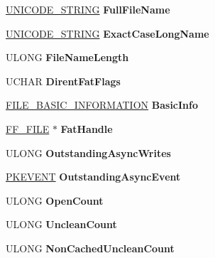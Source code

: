 \begin{DoxyCompactItemize}
\hyperlink{struct___u_n_i_c_o_d_e___s_t_r_i_n_g}{U\+N\+I\+C\+O\+D\+E\+\_\+\+S\+T\+R\+I\+NG} {\bfseries Full\+File\+Name}
\item 
\mbox{\label{struct___f_c_b_a386ad633035f7069f9fc3af793ea5a76}} 
\hyperlink{struct___u_n_i_c_o_d_e___s_t_r_i_n_g}{U\+N\+I\+C\+O\+D\+E\+\_\+\+S\+T\+R\+I\+NG} {\bfseries Exact\+Case\+Long\+Name}
\item 
\mbox{\label{struct___f_c_b_a4d23693b92ed27516199a9417cbaa602}} 
U\+L\+O\+NG {\bfseries File\+Name\+Length}
\item 
\mbox{\label{struct___f_c_b_ac8a1c8e31d1fdef802bd78a8ff2ae67b}} 
U\+C\+H\+AR {\bfseries Dirent\+Fat\+Flags}
\item 
\mbox{\label{struct___f_c_b_a467934276b2da524ed41cd2eef444514}} 
\hyperlink{struct___f_i_l_e___b_a_s_i_c___i_n_f_o_r_m_a_t_i_o_n}{F\+I\+L\+E\+\_\+\+B\+A\+S\+I\+C\+\_\+\+I\+N\+F\+O\+R\+M\+A\+T\+I\+ON} {\bfseries Basic\+Info}
\item 
\mbox{\label{struct___f_c_b_a7b084cb1f38c52eb1218d3fe59ad5ac4}} 
\hyperlink{struct___f_f___f_i_l_e}{F\+F\+\_\+\+F\+I\+LE} $\ast$ {\bfseries Fat\+Handle}
\item 
\mbox{\label{struct___f_c_b_abf6d41b03e408efbb03edb698ef7ee99}} 
U\+L\+O\+NG {\bfseries Outstanding\+Async\+Writes}
\item 
\mbox{\label{struct___f_c_b_a1540703a3bfde0c4f9bf2569f783b989}} 
\hyperlink{struct___k_e_v_e_n_t}{P\+K\+E\+V\+E\+NT} {\bfseries Outstanding\+Async\+Event}
\item 
\mbox{\label{struct___f_c_b_a34c5c7c687436c9b799677c5c370b170}} 
U\+L\+O\+NG {\bfseries Open\+Count}
\item 
\mbox{\label{struct___f_c_b_a195479c24b0bc8d92bcc713af507b312}} 
U\+L\+O\+NG {\bfseries Unclean\+Count}
\item 
\mbox{\label{struct___f_c_b_ab36ac13461b00d94d7488359d87e431b}} 
U\+L\+O\+NG {\bfseries Non\+Cached\+Unclean\+Count}
\item 

\end{DoxyCompactItemize}
